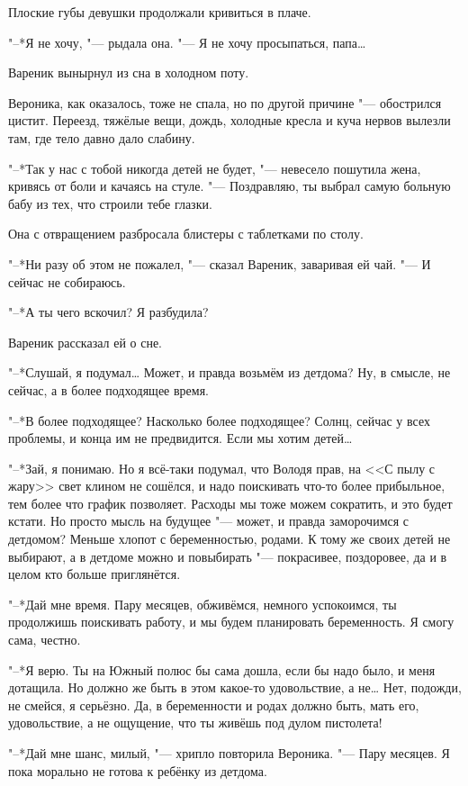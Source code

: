 Плоские губы девушки продолжали кривиться в плаче.

"--*Я не хочу, "--- рыдала она.
"--- Я не хочу просыпаться, папа\dots{}

Вареник вынырнул из сна в холодном поту.

Вероника, как оказалось, тоже не спала, но по другой причине "--- обострился цистит.
Переезд, тяжёлые вещи, дождь, холодные кресла и куча нервов вылезли там, где тело давно дало слабину.

"--*Так у нас с тобой никогда детей не будет, "--- невесело пошутила жена, кривясь от боли и качаясь на стуле.
"--- Поздравляю, ты выбрал самую больную бабу из тех, что строили тебе глазки.

Она с отвращением разбросала блистеры с таблетками по столу.

"--*Ни разу об этом не пожалел, "--- сказал Вареник, заваривая ей чай.
"--- И сейчас не собираюсь.

"--*А ты чего вскочил?
Я разбудила?

Вареник рассказал ей о сне.

"--*Слушай, я подумал\dots{}
Может, и правда возьмём из детдома?
Ну, в смысле, не сейчас, а в более подходящее время.

"--*В более подходящее?
Насколько более подходящее?
Солнц, сейчас у всех проблемы, и конца им не предвидится.
Если мы хотим детей\dots{}

"--*Зай, я понимаю.
Но я всё-таки подумал, что Володя прав, на <<С пылу с жару>> свет клином не сошёлся, и надо поискивать что-то более прибыльное, тем более что график позволяет.
Расходы мы тоже можем сократить, и это будет кстати.
Но просто мысль на будущее "--- может, и правда заморочимся с детдомом?
Меньше хлопот с беременностью, родами.
К тому же своих детей не выбирают, а в детдоме можно и повыбирать "--- покрасивее, поздоровее, да и в целом кто больше приглянётся.

"--*Дай мне время.
Пару месяцев, обживёмся, немного успокоимся, ты продолжишь поискивать работу, и мы будем планировать беременность.
Я смогу сама, честно.

"--*Я верю.
Ты на Южный полюс бы сама дошла, если бы надо было, и меня дотащила.
Но должно же быть в этом какое-то удовольствие, а не\dots{}
Нет, подожди, не смейся, я серьёзно.
Да, в беременности и родах должно быть, мать его, удовольствие, а не ощущение, что ты живёшь под дулом пистолета!

"--*Дай мне шанс, милый, "--- хрипло повторила Вероника.
"--- Пару месяцев.
Я пока морально не готова к ребёнку из детдома.

